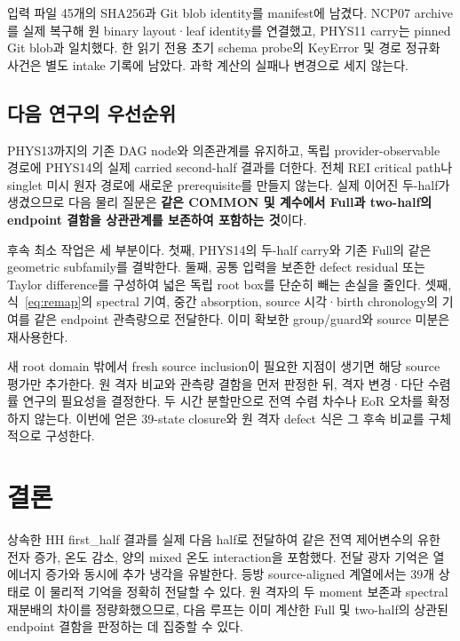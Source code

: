 \documentclass[11pt,a4paper]{article}
\begin{document}
입력 파일 45개의 SHA256과 Git blob identity를 manifest에 남겼다. NCP07 archive를 실제 복구해 원 binary layout·leaf identity를 연결했고, PHYS11 carry는 pinned Git blob과 일치했다. 한 읽기 전용 초기 schema probe의 KeyError 및 경로 정규화 사건은 별도 intake 기록에 남았다. 과학 계산의 실패나 변경으로 세지 않는다.\cite{intake}



\subsection{다음 연구의 우선순위}
PHYS13까지의 기존 DAG node와 의존관계를 유지하고, 독립 provider-observable 경로에 PHYS14의 실제 carried second-half 결과를 더한다. 전체 REI critical path나 singlet 미시 원자 경로에 새로운 prerequisite를 만들지 않는다. 실제 이어진 두-half가 생겼으므로 다음 물리 질문은 \textbf{같은 COMMON 및 계수에서 Full과 two-half의 endpoint 결함을 상관관계를 보존하여 포함하는 것}이다.\cite{dag}

후속 최소 작업은 세 부분이다. 첫째, PHYS14의 두-half carry와 기존 Full의 같은 geometric subfamily를 결박한다. 둘째, 공통 입력을 보존한 defect residual 또는 Taylor difference를 구성하여 넓은 독립 root box를 단순히 빼는 손실을 줄인다. 셋째, 식~\eqref{eq:remap}의 spectral 기여, 중간 absorption, source 시각·birth chronology의 기여를 같은 endpoint 관측량으로 전달한다. 이미 확보한 group/guard와 source 미분은 재사용한다.

새 root domain 밖에서 fresh source inclusion이 필요한 지점이 생기면 해당 source 평가만 추가한다. 원 격자 비교와 관측량 결함을 먼저 판정한 뒤, 격자 변경·다단 수렴률 연구의 필요성을 결정한다. 두 시간 분할만으로 전역 수렴 차수나 EoR 오차를 확정하지 않는다. 이번에 얻은 39-state closure와 원 격자 defect 식은 그 후속 비교를 구체적으로 구성한다.

\section*{결론}
상속한 HH first\_half 결과를 실제 다음 half로 전달하여 같은 전역 제어변수의 유한 전자 증가, 온도 감소, 양의 mixed 온도 interaction을 포함했다. 전달 광자 기억은 열에너지 증가와 동시에 추가 냉각을 유발한다. 등방 source-aligned 계열에서는 39개 상태로 이 물리적 기억을 정확히 전달할 수 있다. 원 격자의 두 moment 보존과 spectral 재분배의 차이를 정량화했으므로, 다음 루프는 이미 계산한 Full 및 two-half의 상관된 endpoint 결함을 판정하는 데 집중할 수 있다.
\end{document}
